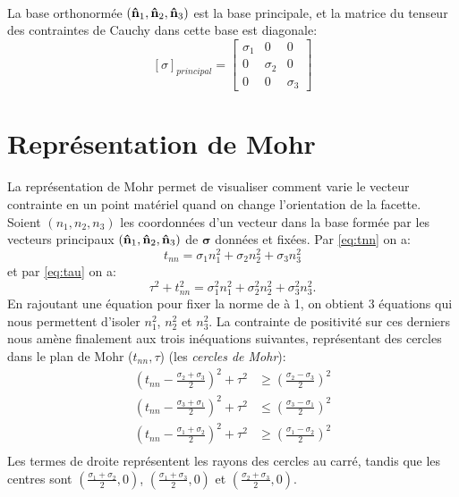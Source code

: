 \paragraph{}
La base orthonormée $(\textbf{\^n}_1,\textbf{\^n}_2,\textbf{\^n}_3)$ est la base principale, et la matrice du tenseur des contraintes de Cauchy dans cette base est diagonale:
$$[\sigma]_{principal}=\left[
\begin{array}{ccc}
\sigma_1&0&0\\
0&\sigma_2&0\\
0&0&\sigma_3
\end{array}\right]$$

\section{Représentation de Mohr}
La représentation de Mohr permet de visualiser comment varie le vecteur contrainte en un point matériel quand on change l'orientation de la facette.
Soient $(n_1, n_2, n_3)$ les coordonnées d'un vecteur dans la base formée par les vecteurs principaux $(\textbf{\^n}_1,\textbf{\^n}_2,\textbf{\^n}_3)$ de $\boldsymbol{\sigma}$ données et fixées.
Par \ref{eq:tnn} on a:
$$t_{nn}=\sigma_1n_1^2+\sigma_2n_2^2+\sigma_3n_3^2$$
et par \ref{eq:tau} on a:
$$\tau^2+t_{nn}^2=\sigma_1^2 n_1^2+\sigma_2^2 n_2^2+\sigma_3^2 n_3^2.$$ En rajoutant une équation pour fixer la norme de  à 1, on obtient 3 équations qui nous permettent d'isoler $n_1^2$, $n_2^2$ et $n_3^2$. La contrainte de positivité sur ces derniers nous amène finalement aux trois inéquations suivantes, représentant des cercles dans le plan de Mohr ($t_{nn},\tau$) (les \emph{cercles de Mohr}):
$$\begin{aligned}
  \left(t_{nn}-\frac{\sigma_2+\sigma_3}{2}\right)^2+\tau^2&\geq \left(\frac{\sigma_2-\sigma_3}{2}\right)^2\\
  \left(t_{nn}-\frac{\sigma_3+\sigma_1}{2}\right)^2+\tau^2&\leq \left(\frac{\sigma_3-\sigma_1}{2}\right)^2\\
  \left(t_{nn}-\frac{\sigma_1+\sigma_2}{2}\right)^2+\tau^2&\geq \left(\frac{\sigma_1-\sigma_2}{2}\right)^2\\
\end{aligned}$$
Les termes de droite représentent les rayons des cercles au carré, tandis que les centres sont $\left(\frac{\sigma_1+\sigma_2}{2},0\right)$, $\left(\frac{\sigma_1+\sigma_3}{2},0\right)$ et $\left(\frac{\sigma_2+\sigma_3}{2},0\right)$.
